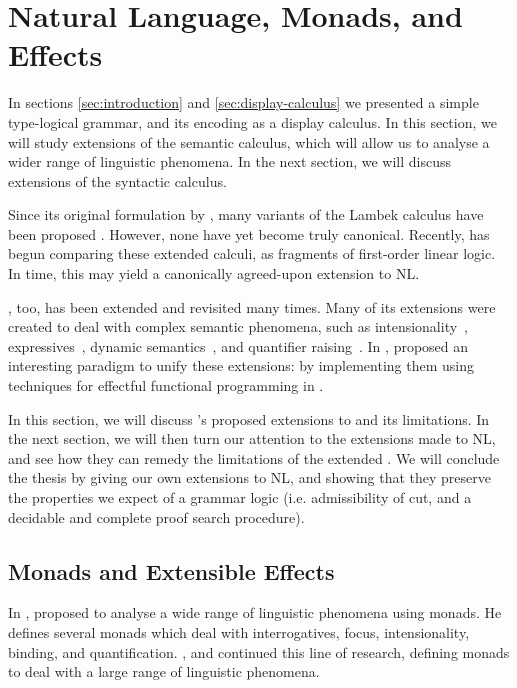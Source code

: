 \section{Natural Language, Monads, and Effects}

In sections \autoref{sec:introduction} and
\autoref{sec:display-calculus} we presented a simple type-logical
grammar, and its encoding as a display calculus. In this section, we
will study extensions of the semantic calculus, which will allow us to
analyse a wider range of linguistic phenomena. In the next section, we
will discuss extensions of the syntactic calculus.

Since its original formulation by \citet{lambek1961}, many variants of
the Lambek calculus have been proposed
\citep{steedman1988,moortgat2012,morrill2011,kubota2012,barker2015}.
However, none have yet become truly canonical.
Recently, \citet{moot2015} has begun comparing these extended calculi,
as fragments of first-order linear logic. In time, this may yield a
canonically agreed-upon extension to NL.

\lamET, too, has been extended and revisited many times. Many of its
extensions were created to deal with complex semantic phenomena, such
as intensionality~\citep{winter2009},
expressives~\citep{potts2003,mccready2010,gutzmann2011}, dynamic
semantics~\citep{groenendijk1995}, and quantifier
raising~\citep{barker2015}. 
In \citeyear{shan2002}, \citeauthor{shan2002} proposed an interesting
paradigm to unify these extensions: by implementing them using
techniques for effectful functional programming in \lamET.

In this section, we will discuss \citeauthor{shan2002}'s proposed
extensions to \lamET and its limitations. In the next section, we will
then turn our attention to the extensions made to NL, and see how they
can remedy the limitations of the extended \lamET. We will conclude
the thesis by giving our own extensions to NL, and showing that they
preserve the properties we expect of a grammar logic
(i.e. admissibility of cut, and a decidable and complete proof search
procedure).

\subsection{Monads and Extensible Effects}
In \citeyear{shan2002}, \citeauthor{shan2002} proposed to analyse a
wide range of linguistic phenomena using monads. He defines several
monads which deal with interrogatives, focus, intensionality, binding,
and quantification. \citet{bumford2013}, \citet{charlow2014} and
\citet{barker2015} continued this line of research, defining monads to
deal with a large range of linguistic phenomena.

